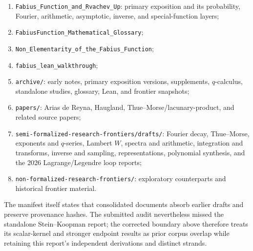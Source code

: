 \documentclass[11pt,oneside]{article}
\theoremstyle{definition}
\theoremstyle{remark}
\begin{document}
\begin{enumerate}
\item \texttt{Fabius\_Function\_and\_Rvachev\_Up}: primary exposition and its
probability, Fourier, arithmetic, asymptotic, inverse, and special-function layers;
\item \texttt{FabiusFunction\_Mathematical\_Glossary};
\item \texttt{Non\_Elementarity\_of\_the\_Fabius\_Function};
\item \texttt{fabius\_lean\_walkthrough};
\item \texttt{archive/}: early notes, primary exposition versions, supplements,
$q$-calculus, standalone studies, glossary, Lean, and frontier snapshots;
\item \texttt{papers/}: Arias de Reyna, Haugland, Thue--Morse/lacunary-product,
and related source papers;
\item \texttt{semi-formalized-research-frontiers/drafts/}: Fourier decay,
Thue--Morse, exponents and $q$-series, Lambert $W$, spectra and arithmetic,
integration and transforms, inverse and sampling, representations, polynomial
synthesis, and the 2026 Lagrange/Legendre loop reports;
\item \texttt{non-formalized-research-frontiers/}: exploratory counterparts and
historical frontier material.
\end{enumerate}

The manifest itself states that consolidated documents absorb earlier drafts and
preserve provenance hashes.  The submitted audit nevertheless missed the
standalone Stein--Koopman report; the corrected boundary above therefore treats
its scalar-kernel and stronger endpoint results as prior corpus overlap while
retaining this report's independent derivations and distinct strands.
\end{document}
